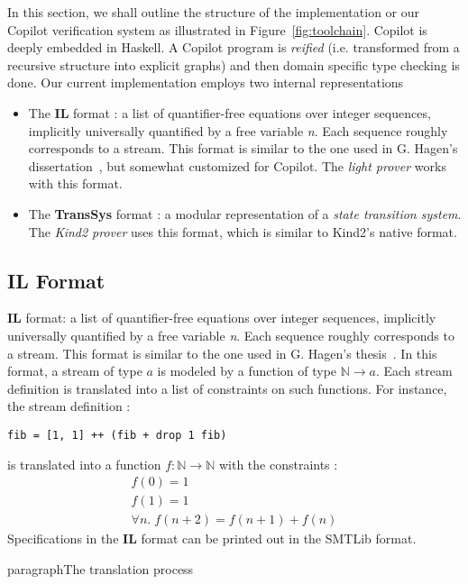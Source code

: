 In this section, we shall outline the structure of the implementation
or our Copilot verification system as illustrated in
Figure~\ref{fig:toolchain}.  Copilot is deeply embedded in
Haskell.  A Copilot program is \emph{reified} (i.e. transformed from
a recursive structure into explicit graphs) and then domain specific
type checking is done. Our current implementation employs two internal
representations 
\begin{itemize}
\item
  The \textbf{IL} format : a list
  of quantifier-free equations over integer sequences, implicitly
  universally quantified by a free variable \emph{n}. Each sequence
  roughly corresponds to a stream.   This
format is similar to the one used in G.  Hagen's
dissertation~\cite{HagenPhD}, but somewhat customized for Copilot.   The \emph{light prover} works with this
  format.
\item The \textbf{TransSys} format : a modular representation of a
  \emph{state transition system}. The \emph{Kind2 prover} uses this
  format, which is similar to Kind2's native format.
\end{itemize}

\subsection{IL Format} \textbf{IL} format: a list of quantifier-free equations
over integer sequences, implicitly universally quantified by a free
variable \emph{n}. Each sequence roughly corresponds to a stream. This
format is similar to the one used in G.  Hagen's
thesis~\cite{HagenPhD}.  
In this format, a stream of type $a$ is modeled by a function of type $\mathbb{N} \to a$. Each stream definition is translated into a list of constraints on such functions. For instance, the stream definition :
\begin{lstlisting}
fib = [1, 1] ++ (fib + drop 1 fib)
\end{lstlisting}
is translated into a function $f : \mathbb{N} \to \mathbb{N}$ with the constraints :
$$
\begin{array}{c}
f(0) = 1 \\
f(1) = 1 \\
\forall n . \; f(n + 2) = f(n + 1) + f(n)
\end{array}
$$
Specifications in the \textbf{IL} format can be printed out in the
SMTLib format. 

paragraph{The translation process} 

